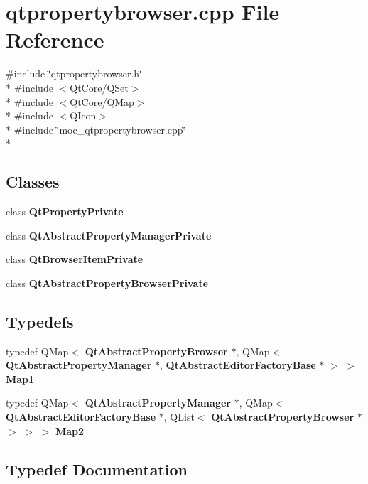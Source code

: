 \section{qtpropertybrowser.\+cpp File Reference}
\label{qtpropertybrowser_8cpp}
{\ttfamily \#include \char`\"{}qtpropertybrowser.\+h\char`\"{}}\\*
{\ttfamily \#include $<$Qt\+Core/\+Q\+Set$>$}\\*
{\ttfamily \#include $<$Qt\+Core/\+Q\+Map$>$}\\*
{\ttfamily \#include $<$Q\+Icon$>$}\\*
{\ttfamily \#include \char`\"{}moc\+\_\+qtpropertybrowser.\+cpp\char`\"{}}\\*
\subsection*{Classes}
\begin{DoxyCompactItemize}
\item 
class {\bf Qt\+Property\+Private}
\item 
class {\bf Qt\+Abstract\+Property\+Manager\+Private}
\item 
class {\bf Qt\+Browser\+Item\+Private}
\item 
class {\bf Qt\+Abstract\+Property\+Browser\+Private}
\end{DoxyCompactItemize}
\subsection*{Typedefs}
\begin{DoxyCompactItemize}
\item 
typedef Q\+Map$<$ {\bf Qt\+Abstract\+Property\+Browser} $\ast$, Q\+Map$<$ {\bf Qt\+Abstract\+Property\+Manager} $\ast$, {\bf Qt\+Abstract\+Editor\+Factory\+Base} $\ast$ $>$ $>$ {\bf Map1}
\item 
typedef Q\+Map$<$ {\bf Qt\+Abstract\+Property\+Manager} $\ast$, Q\+Map$<$ {\bf Qt\+Abstract\+Editor\+Factory\+Base} $\ast$, Q\+List$<$ {\bf Qt\+Abstract\+Property\+Browser} $\ast$ $>$ $>$ $>$ {\bf Map2}
\end{DoxyCompactItemize}


\subsection{Typedef Documentation}
